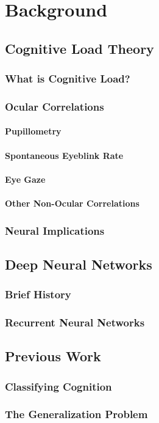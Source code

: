 \chapter{Background}

\section{Cognitive Load Theory}
\subsection{What is Cognitive Load?}
\subsection{Ocular Correlations}
\subsubsection{Pupillometry}
\subsubsection{Spontaneous Eyeblink Rate}
\subsubsection{Eye Gaze}
\subsubsection{Other Non-Ocular Correlations}

\subsection{Neural Implications}

\section{Deep Neural Networks}
\subsection{Brief History}
\subsection{Recurrent Neural Networks}

\section{Previous Work}
\subsection{Classifying Cognition}
\subsection{The Generalization Problem}
